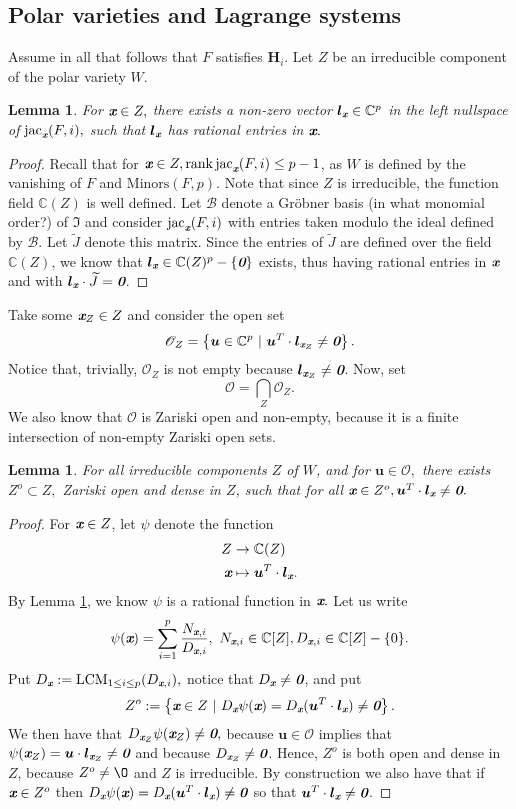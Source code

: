 \documentclass[a4paper]{article}
\def\bz{\textit{\textbf{0}}}
\def\ub{{\bm u}}
\def\lb{{\bm l}}
\def\xb{\textit{\textbf{x}}}
\def\jt{\widetilde{J}}
\DeclareMathOperator{\LCM}{LCM}
\DeclareMathOperator{\jac}{jac}
\DeclareMathOperator{\rk}{rank}
\def\minors{\textrm{Minors}(F,p)}
\def\C{\mathbb{C}}
\def\I{\mathfrak{I}}
\def\ji{\jac_{\xb}(F,i)}
\newtheorem{lemma}[theorem]{Lemma}
\begin{document}
\subsection{Polar varieties and Lagrange systems}
%
Assume in all that follows that $F$ satisfies $\bm H_i$. Let $Z$ be an irreducible component of the polar variety $W$.  
%
\begin{lemma}\label{lem:3.7}
For $\xb \in Z,$ there exists a non-zero vector $\lb_{\xb}\in \C^p$ in the left nullspace of $\ji,$ such that $\lb_{\xb}$ has rational entries in $\xb.$
\end{lemma}
%
\begin{proof}
Recall that for $\xb \in Z, \rk \ji \leq p-1$, as $W$ is defined by the vanishing of $F$ and $\minors$. Note that since $Z$ is irreducible, the function field $\C(Z)$ is well defined. Let $\mathscr{B}$ denote a Gr\"obner basis (in what monomial order?) of $\I$ and consider $\jac_{\xb}(F,i)$  with entries taken modulo the ideal defined by $\mathscr{B}.$ Let $\jt$ denote this matrix. Since the entries of $\jt$ are defined over the field $\C(Z)$, we know that  $\lb_{\xb} \in \C(Z)^p-\{\bz\}$ exists, thus having rational entries in $\xb$ and with $\lb_{\xb} \cdot \jt = \bz$. 
\end{proof}
%
\noindent
Take some $\xb_Z \in Z$ and consider the open set
\[
\mathscr{O}_{Z} = 
\left\{\ub \in \C^p~|~\ub^T\cdot \lb_{\xb_Z} \not = \textit{\textbf{0}}\right\}.
\]
Notice that, trivially, $\mathscr{O}_Z$ is not empty because $\lb_{\xb_Z} \not = \bz$. Now, set
\[
\mathscr{O} = 
\bigcap_Z \mathscr{O}_{Z}.
\]
We also know that $\mathscr{O}$ is Zariski open and non-empty, because it is a finite intersection of non-empty Zariski open sets.
%
\begin{lemma}\label{lem:3.8}
For all irreducible components $Z$ of $W$, and for $\ub \in \mathscr{O},$ there exists $Z^o \subset Z,$ Zariski open and dense in $Z$, such that for all $\xb \in Z^o, \ub^T\cdot \lb_{\xb} \not = \bz.$
\end{lemma}
%
\begin{proof}
For $\xb \in Z$, let $\psi$ denote the function 
\begin{align*}
Z  &\rightarrow \C(Z)\\    
    \xb &\mapsto \ub^T \cdot \lb_{\xb}.    
\end{align*}
 By Lemma \ref{lem:3.7}, we know $\psi$ is a rational function in $\xb.$ Let us write 
\[
\psi(\xb) = \sum_{i=1}^p\frac{N_{\xb,i}}{D_{\xb,i}},~N_{\xb,i} \in \C[Z], D_{\xb,i} \in \C[Z]-\{0\}. 
\]
Put $D_{\xb} := \LCM_{1\leq i \leq p}(D_{\xb,i}),$ notice that $D_{\xb} \not = \bz$, and put  
\[
Z^o := \left\{\xb \in Z~|~D_{\xb}\psi(\xb) = D_{\xb}(\ub^T \cdot \lb_{\xb})\not = \bz\right\}.
\]
We then have that $D_{\xb_Z}\psi(\xb_Z) \not = \bz,$
because $\ub \in \mathscr{O}$ implies that $\psi(\xb_Z)= \ub \cdot \lb_{\xb_Z} \not = \bz$ and because $D_{\xb_Z} \not = \bz$.  Hence, $Z^o$ is both open and dense in $Z$, because $Z^o \not = \O$ and $Z$ is irreducible. By construction we also have that if $\xb \in Z^o$ then $D_{\xb}\psi(\xb) = D_{\xb}(\ub^T \cdot \lb_{\xb})\not = \bz$ so that $\ub^T \cdot \lb_{\xb}\not = \bz$.
\end{proof}
\end{document}
